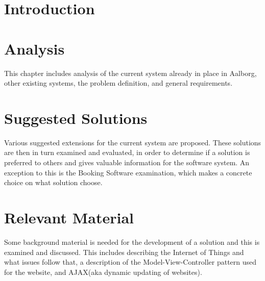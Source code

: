 
\usepackage[disable]{todonotes}					%
\newcommand{\bycykelwithoutspace}{Aalborg Bycykel}
\newcommand{\bycykel}{\bycykelwithoutspace{ }}


	
	\newpage\null\thispagestyle{empty}\newpage
	
	\addtocounter{page}{4}
	\newpage\null\thispagestyle{empty}\newpage
	
	\newpage\null\thispagestyle{empty}\newpage
	
	\label{startoftoc}
	\begin{KeepFromToc}
		\tableofcontents
		\newpage\null\thispagestyle{empty}\newpage
		\newpage\null\thispagestyle{empty}\newpage
		\todototoc
		\listoftodos
	\end{KeepFromToc}
	\label{endoftoc}
	
	\chapter{Introduction}
	
	\chapter{Analysis}
	This chapter includes analysis of the current system already in place in Aalborg, other existing systems, the problem definition, and general requirements.
	
	
	
	
	
	
	\chapter{Suggested Solutions}
	Various suggested extensions for the current system are proposed.
	These solutions are then in turn examined and evaluated, in order to determine if a solution is preferred to others and gives valuable information for the software system.
	An exception to this is the Booking Software examination, which makes a concrete choice on what solution choose.
	
	
	
	
	
	
	\chapter{Relevant Material}
	Some background material is needed for the development of a solution and this is examined and discussed. This includes describing the Internet of Things and what issues follow that, a description of the Model-View-Controller pattern used for the website, and AJAX(aka dynamic updating of websites). 
	
	
	
	
	
